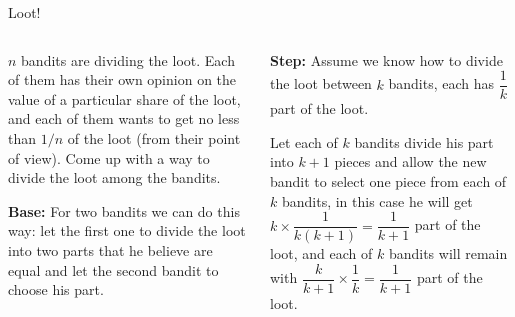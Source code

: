 \documentclass[9pt,aspectratio=169]{beamer}
\begin{document}
\begin{frame}{Loot!}
  \begin{columns}[T]
    \begin{column}{0.5\textwidth}
      \begin{problem}
        $n$ bandits are dividing the loot. Each of them has their own opinion on the value of a particular share of the loot, and each of them wants to get no less than $1/n$ of the loot (from their point of view). Come up with a way to divide the loot among the bandits.
      \end{problem}\pause
      \textbf{Base:} For two bandits we can do this way: let the first one to divide the loot into two parts that he believe are equal and let the second bandit to choose his part.\pause

    \end{column}
    \begin{column}{0.5\textwidth}
      
      \textbf{Step:} Assume we know how to divide the loot between $k$ bandits, each has $\dfrac{1}{k}$ part of the loot.\pause

      Let each of $k$ bandits divide his part into $k+1$ pieces and allow the new bandit to select one piece from each of $k$ bandits, in this case he will get $k \times \dfrac{1}{k (k + 1)} = \dfrac{1}{k+1}$ part of the loot, and each of $k$ bandits will remain with $\dfrac{k}{k+1}  \times \dfrac{1}{k} = \dfrac{1}{k+1}$ part of the loot. 
    \end{column}
  \end{columns}
\end{frame}
\end{document}
